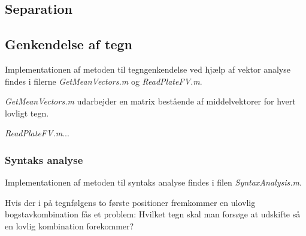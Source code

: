 \label{sec_implementation}


\subsection{Separation}


\subsection{Genkendelse af tegn}

Implementationen af metoden til tegngenkendelse ved hjælp af vektor analyse findes i filerne \textit{GetMeanVectors.m} og \textit{ReadPlateFV.m}.

\textit{GetMeanVectors.m} udarbejder en matrix bestående af middelvektorer for hvert lovligt tegn.

\textit{ReadPlateFV.m}...


\subsubsection{Syntaks analyse}

Implementationen af metoden til syntaks analyse findes i filen \textit{SyntaxAnalysis.m}.

Hvis der i på tegnfølgens to første positioner fremkommer en ulovlig bogstavkombination fås et problem: Hvilket tegn skal man forsøge at udskifte så en lovlig kombination forekommer? 